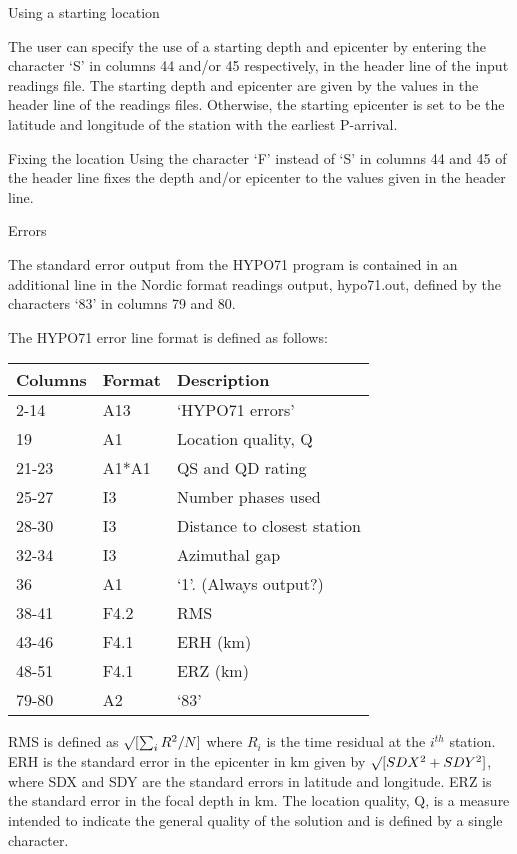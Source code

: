 Using a starting location 

The user can specify the use of a starting depth and epicenter by entering the character `S' in columns 44 and/or 45 respectively, in the header line of the input readings file. The starting depth and epicenter are given by the values in the header line of the readings files. Otherwise, the starting epicenter is set to be the latitude and longitude of the station with the earliest P-arrival. 

Fixing the location Using the character `F' instead of `S' in columns 44 and 45 of the header line fixes the depth and/or epicenter to the values given in the header line. 

Errors 

The standard error output from the HYPO71 program is contained in an additional line in the Nordic format readings output, hypo71.out, defined by the characters `83' in columns 79 and 80. 

The HYPO71 error line format is defined as follows: 

\begin{tabular}{|lll|}
\hline
Columns & Format & Description \\
\hline
2-14 & A13 & `HYPO71 errors' \\
19 & A1 & Location quality, Q \\
21-23 & A1*A1 & QS and QD rating \\
25-27 & I3 & Number phases used \\
28-30 & I3 & Distance to closest station \\
32-34 & I3 & Azimuthal gap \\
36 & A1 & `1'. (Always output?) \\
38-41 & F4.2 & RMS \\
43-46 & F4.1 & ERH (km) \\
48-51 & F4.1 & ERZ (km) \\
79-80 & A2 & `83'\\
\hline
\end{tabular}
 

RMS is defined as 
$\surd[\sum_{i}R^2 / N]$ where $R_{i}$ is the time residual at the $i^{th}$ station. 
ERH is the standard error in the epicenter in km given by 
$\surd[SDX^2 + SDY^2]$, where SDX and SDY are the standard errors in latitude and longitude. ERZ is the standard error in the focal depth in km. The location quality, Q, is a measure intended to indicate the general quality of the solution and is defined by a single character. 

